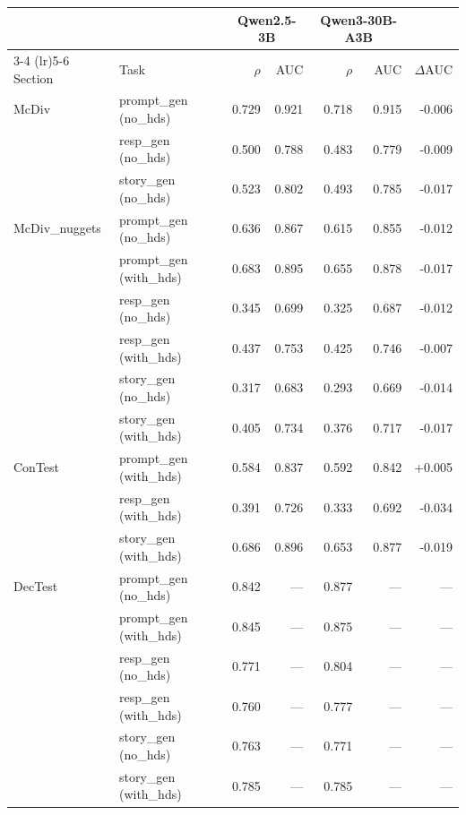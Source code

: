 \begin{tabular}{@{}llrrrrr@{}}
\toprule
 &  & \multicolumn{2}{c}{Qwen2.5-3B} & \multicolumn{2}{c}{Qwen3-30B-A3B} & \\
\cmidrule(lr){3-4} \cmidrule(lr){5-6}
Section & Task & $\rho$ & AUC & $\rho$ & AUC & $\Delta$AUC \\
\midrule
McDiv & prompt\_gen (no\_hds) & 0.729 & 0.921 & 0.718 & 0.915 & -0.006 \\
 & resp\_gen (no\_hds) & 0.500 & 0.788 & 0.483 & 0.779 & -0.009 \\
 & story\_gen (no\_hds) & 0.523 & 0.802 & 0.493 & 0.785 & -0.017 \\
\midrule
McDiv\_nuggets & prompt\_gen (no\_hds) & 0.636 & 0.867 & 0.615 & 0.855 & -0.012 \\
 & prompt\_gen (with\_hds) & 0.683 & 0.895 & 0.655 & 0.878 & -0.017 \\
 & resp\_gen (no\_hds) & 0.345 & 0.699 & 0.325 & 0.687 & -0.012 \\
 & resp\_gen (with\_hds) & 0.437 & 0.753 & 0.425 & 0.746 & -0.007 \\
 & story\_gen (no\_hds) & 0.317 & 0.683 & 0.293 & 0.669 & -0.014 \\
 & story\_gen (with\_hds) & 0.405 & 0.734 & 0.376 & 0.717 & -0.017 \\
\midrule
ConTest & prompt\_gen (with\_hds) & 0.584 & 0.837 & 0.592 & 0.842 & +0.005 \\
 & resp\_gen (with\_hds) & 0.391 & 0.726 & 0.333 & 0.692 & -0.034 \\
 & story\_gen (with\_hds) & 0.686 & 0.896 & 0.653 & 0.877 & -0.019 \\
\midrule
DecTest & prompt\_gen (no\_hds) & 0.842 & --- & 0.877 & --- & --- \\
 & prompt\_gen (with\_hds) & 0.845 & --- & 0.875 & --- & --- \\
 & resp\_gen (no\_hds) & 0.771 & --- & 0.804 & --- & --- \\
 & resp\_gen (with\_hds) & 0.760 & --- & 0.777 & --- & --- \\
 & story\_gen (no\_hds) & 0.763 & --- & 0.771 & --- & --- \\
 & story\_gen (with\_hds) & 0.785 & --- & 0.785 & --- & --- \\
\bottomrule
\end{tabular}

